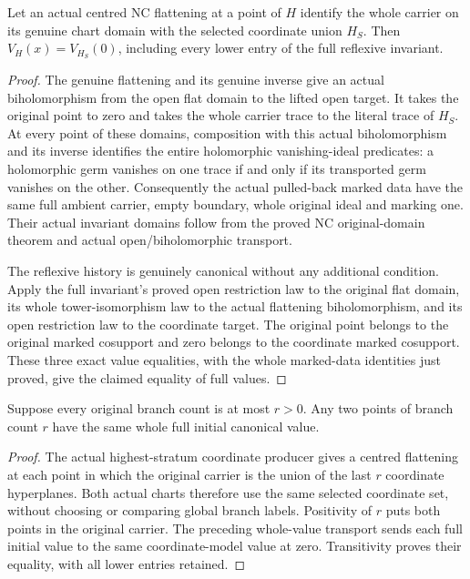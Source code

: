 \begin{lemma}
\label{hir:general-nc-initial-full-value-flat-chart}
\leanok
{}
Let an actual centred NC flattening at a point of $H$ identify the whole
carrier on its genuine chart domain with the selected coordinate union
$H_S$. Then $V_H(x)=V_{H_S}(0)$, including every lower entry of the
full reflexive invariant.
\end{lemma}
\begin{proof}
The genuine flattening and its genuine inverse give an actual
biholomorphism from the open flat domain to the lifted open target.
It takes the original point to zero and takes the whole carrier trace
to the literal trace of $H_S$. At every point of these domains,
composition with this actual biholomorphism and its inverse identifies
the entire holomorphic vanishing-ideal predicates: a holomorphic germ
vanishes on one trace if and only if its transported germ vanishes on
the other. Consequently the actual pulled-back marked data have the
same full ambient carrier, empty boundary, whole original ideal and
marking one. Their actual invariant domains follow from the proved NC
original-domain theorem and actual open/biholomorphic transport.

The reflexive history is genuinely canonical without any additional
condition. Apply the full invariant's proved open restriction law to
the original flat domain, its whole tower-isomorphism law to the actual
flattening biholomorphism, and its open restriction law to the coordinate
target. The original point belongs to the original marked cosupport
and zero belongs to the coordinate marked cosupport. These three exact
value equalities, with the whole marked-data identities just proved,
give the claimed equality of full values.
\end{proof}

\begin{lemma}
\label{hir:general-nc-initial-full-highest-stratum-constant}
\leanok
{}
Suppose every original branch count is at most $r>0$. Any two points of
branch count $r$ have the same whole full initial canonical value.
\end{lemma}
\begin{proof}
The actual highest-stratum coordinate producer gives a centred
flattening at each point in which the original carrier is the union of
the last $r$ coordinate hyperplanes. Both actual charts therefore use
the same selected coordinate set, without choosing or comparing global
branch labels. Positivity of $r$ puts both points in the original
carrier. The preceding whole-value transport sends each full initial
value to the same coordinate-model value at zero. Transitivity proves
their equality, with all lower entries retained.
\end{proof}

